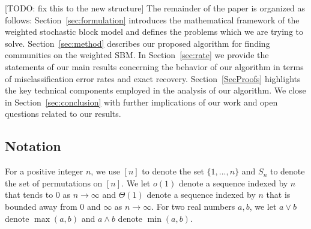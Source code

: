 \documentclass{article}
\begin{document}



[TODO: fix this to the new structure]
The remainder of the paper is organized as follows: Section~\ref{sec:formulation} introduces the mathematical framework of the weighted stochastic block model and defines the problems which we are trying to solve. Section~\ref{sec:method} describes our proposed algorithm for finding communities on the weighted SBM. In Section~\ref{sec:rate} we provide the statements of our main results concerning the behavior of our algorithm in terms of misclassification error rates and exact recovery. Section~\ref{SecProofs} highlights the key technical components employed in the analysis of our algorithm. We close in Section~\ref{sec:conclusion} with further implications of our work and open questions related to our results.



\subsection{Notation}

For a positive integer $n$, we use $[n]$ to denote the set $\{1, ..., n\}$ and $S_n$ to denote the set of permutations on $[n]$. We let $o(1)$ denote a sequence indexed by $n$ that tends to 0 as $n \rightarrow \infty$ and $\Theta(1)$ denote a sequence indexed by $n$ that is bounded away from 0 and $\infty$ as $n \rightarrow \infty$. For two real numbers $a,b$, we let $a \vee b$ denote $\max(a,b)$ and $a \wedge b$ denote $\min(a,b)$.
\end{document}
